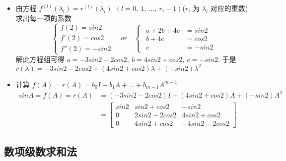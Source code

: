 \begin{solution}
\begin{itemize}
\begin{itemize}
                            \item 由方程 $f^{(l)}(\lambda_i) = r^{(l)}(\lambda_i) \ \ (l = 0, \ 1, \ \dots, \ r_i - 1)$($r_i$ 为 $\lambda_i$ 对应的重数) 求出每一项的系数
                                \begin{equation*}
                                    \begin{cases}
                                        f(2) = sin2 \\ f'(2) = cos2 \\ f''(2) = -sin2
                                    \end{cases} \quad or \quad \begin{cases} \begin{aligned}
                                        a + 2b + 4c &= sin2 \\ b + 4c &= cos2 \\  c &= -sin2 
                                        \end{aligned}    
                                    \end{cases}
                                \end{equation*}
                                解此方程组可得 $a = -3sin2 - 2cos2, \ b = 4sin2 + cos2, \ c = -sin2$. 于是 $r(\lambda) = -3sin2 - 2cos2 + (4sin2 + cos2)\lambda + (-sin2)\lambda^2$
                            \item 计算 $f(A) = r(A) = b_0I + b_1A + \dots + b_{m-1}A^{m-1}$
                                \begin{align*}
                                    sinA = f(A) = r(A) &= (-3sin2 - 2cos2)I + (4sin2 + cos2)A + (-sin2)A^2 \\ &= \begin{bmatrix}
                                        sin2 & sin2 + cos2 & -sin2 \\ 0 & 2sin2 - 2cos2 & 4sin2 + cos2 \\ 0 & 4sin2 + cos2 & -4sin2 - 2cos2
                                    \end{bmatrix}
                                \end{align*}
                        \end{itemize}
                \end{itemize}
            \end{solution}

    \subsection{数项级数求和法}
